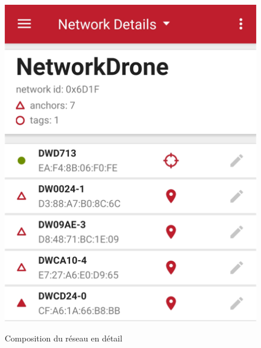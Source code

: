         \begin{minipage}[c]{0.45\linewidth}
            \begin{figure}[H]
                \centering
            	\begin{frame}{\includegraphics[width=1\textwidth]{image/UI_Decawave1.png}}
            	\end{frame}
            	\caption{\label{fig:listeCartes}Composition du réseau en détail}
            \end{figure}
        \end{minipage} \hfill
